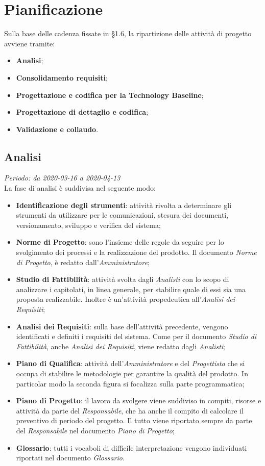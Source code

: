 \section{Pianificazione}
Sulla base delle cadenza fissate in §1.6, la ripartizione delle attività di progetto avviene tramite:
\begin{itemize}
\item \textbf{Analisi};
\item \textbf{Consolidamento requisiti};
\item \textbf{Progettazione e codifica per la Technology Baseline};
\item \textbf{Progettazione di dettaglio e codifica};
\item \textbf{Validazione e collaudo}.
\end{itemize}  

\subsection{Analisi}
\textit{Periodo: da 2020-03-16 a 2020-04-13} \\
La fase di analisi è suddivisa nel seguente modo:
\begin{itemize}
\item \textbf{Identificazione degli strumenti}: attività rivolta a determinare gli strumenti da utilizzare per le comunicazioni, stesura dei documenti, versionamento, sviluppo e verifica del sistema;
\item \textbf{Norme di Progetto}: sono l'insieme delle regole da seguire per lo svolgimento dei processi e la realizzazione del prodotto. Il documento \textit{Norme di Progetto}, è redatto dall'\textit{Amministratore};
\item \textbf{Studio di Fattibilità}: attività svolta dagli \textit{Analisti} con lo scopo di analizzare i capitolati, in linea generale, per stabilire quale di essi sia una proposta realizzabile. Inoltre è un'attività propedeutica all'\textit{Analisi dei Requisiti};
\item \textbf{Analisi dei Requisiti}: sulla base dell'attività precedente, vengono identificati e definiti i requisiti del sistema. Come per il documento \textit{Studio di Fattibilità}, anche \textit{Analisi dei Requisiti}, viene redatto dagli \textit{Analisti};
\item \textbf{Piano di Qualifica}: attività dell'\textit{Amministratore} e del \textit{Progettista} che si occupa di stabilire le metodologie per garantire la qualità del prodotto. In particolar modo la seconda figura si focalizza sulla parte programmatica;
\item \textbf{Piano di Progetto}: il lavoro da svolgere viene suddiviso in compiti, risorse e attività da parte del \textit{Responsabile}, che ha anche il compito di calcolare il preventivo di periodo del progetto. Il tutto viene riportato sempre da parte del \textit{Responsabile} nel documento \textit{Piano di Progetto};
\item \textbf{Glossario}: tutti i vocaboli di difficile interpretazione vengono individuati riportati nel documento \textit{Glossario}.
\end{itemize}

